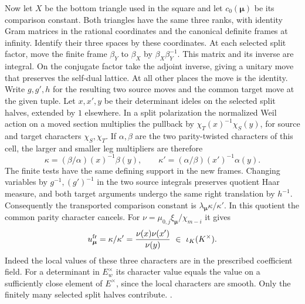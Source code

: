 Now let \(X\) be the bottom triangle used in the square and let
\(c_0(\boldsymbol\mu)\) be its comparison constant. Both triangles
have the same three ranks, with identity Gram matrices in the
rational coordinates and the canonical definite frames at
infinity. Identify their three spaces by these coordinates. At
each selected split factor, move the finite frame
\(\beta_Y\) to \(\beta_X\) by \(\beta_X\beta_Y^{-1}\).
This matrix and its inverse are integral. On the conjugate factor
take the adjoint inverse, giving a unitary move that preserves
the self-dual lattice. At all other places the move is the identity.
Write \(g,g',h\) for the resulting two source moves and the common
target move at the given tuple. Let \(x,x',y\) be their determinant
ideles on the selected split halves, extended by \(1\) elsewhere.
In a split polarization the normalized Weil action on a moved
section multiplies the pullback by
\(\chi_T(x)^{-1}\chi_S(y)\), for source and target characters
\(\chi_S,\chi_T\). If \(\alpha,\beta\) are the two parity-twisted
characters of this cell, the larger and smaller leg multipliers
are therefore
\[
    \kappa=(\beta/\alpha)(x)^{-1}\beta(y),
    \qquad
    \kappa'=(\alpha/\beta)(x')^{-1}\alpha(y).
\]
The finite tests have the same defining support in the new frames.
Changing variables by \(g^{-1},(g')^{-1}\) in the two source
integrals preserves quotient Haar measure, and both target
arguments undergo the same right translation by \(h^{-1}\).
Consequently the transported comparison constant is
\(\lambda_{\boldsymbol\mu}\kappa/\kappa'\). In this quotient the
common parity character cancels. For
\(\nu=\mu_{0,j}\xi_{\boldsymbol\mu}/\chi_{m-i}\) it gives
\[
       u^{\rm fr}_{\boldsymbol\mu}
       =\kappa/\kappa'=\frac{\nu(x)\nu(x')}{\nu(y)}
       \ \in\ \iota_K(K^\times).
\]
Indeed the local values of these three characters are in the
prescribed coefficient field. For a determinant in \(E_w^\times\)
its character value equals the value on a sufficiently close
element of \(E^\times\), since the local characters are smooth.
Only the finitely many selected split halves contribute.
.

